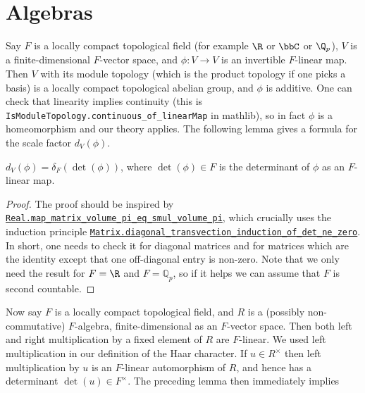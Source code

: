 \section{Algebras}

  Say $F$ is a locally compact topological field (for example $\R$ or $\bbC$ or $\Q_p$), $V$
  is a finite-dimensional $F$-vector space, and $\phi:V\to V$ is an invertible $F$-linear map.
  Then $V$ with its module topology (which is the product topology if one picks a basis)
  is a locally compact topological abelian group, and $\phi$ is additive.
  One can check that linearity implies continuity (this is {\tt IsModuleTopology.continuous\_of\_linearMap} in mathlib),
  so in fact $\phi$ is a homeomorphism
  and our theory applies. The following lemma gives a formula for the scale factor $d_V(\phi)$.

\begin{lemma}
  \label{addHaarScalarFactor_eq_distribHaarChar_det}
  $d_V(\phi)=\delta_F(\det(\phi))$, where $\det(\phi)\in F$ is the determinant of $\phi$ as an $F$-linear map.
\end{lemma}
\begin{proof}
The proof should be inspired by \href{https://leanprover-community.github.io/mathlib4\_docs/Mathlib/MeasureTheory/Measure/Lebesgue/Basic.html\#Real.map\_matrix\_volume\_pi\_eq\_smul\_volume\_pi}{\tt Real.map\_matrix\_volume\_pi\_eq\_smul\_volume\_pi},
which crucially uses the induction principle \href{https://leanprover-community.github.io/mathlib4\_docs/Mathlib/LinearAlgebra/Matrix/Transvection.html\#Matrix.diagonal\_transvection\_induction\_of\_det\_ne\_zero}{\tt Matrix.diagonal\_transvection\_induction\_of\_det\_ne\_zero}.
In short, one needs to check it for diagonal matrices and for matrices which are the identity
except that one off-diagonal entry is non-zero. Note that we only need the result for $F=\R$
and $F=\mathbb{Q}_p$, so if it helps we can assume that $F$ is second countable.
\end{proof}

  Now say $F$ is a locally compact topological field, and $R$ is a (possibly non-commutative)
  $F$-algebra, finite-dimensional as an $F$-vector space. Then both left and right multiplication
  by a fixed element of $R$ are $F$-linear. We used left multiplication in our definition
  of the Haar character. If $u\in R^\times$ then left multiplication by $u$
  is an $F$-linear automorphism of $R$, and hence has a determinant $\det(u)\in F^\times$.
  The preceding lemma then immediately implies

